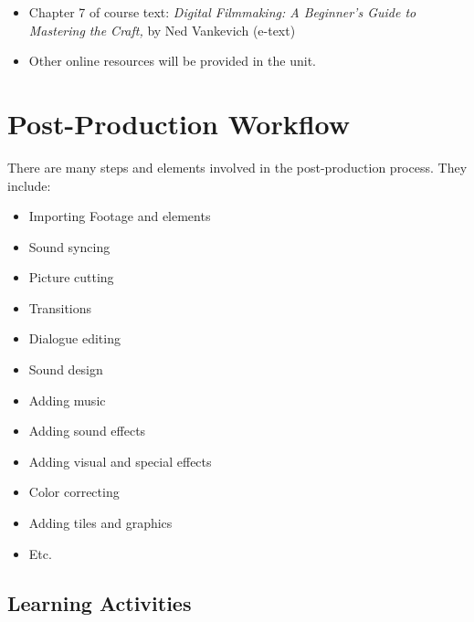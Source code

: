 \documentclass[
]{book}
\providecommand{\tightlist}{%
  \setlength{\itemsep}{0pt}\setlength{\parskip}{0pt}}
\begin{document}
\begin{itemize}
\tightlist
\item
  Chapter 7 of course text: \emph{Digital Filmmaking: A Beginner's Guide to Mastering the Craft,} by Ned Vankevich (e-text)
\item
  Other online resources will be provided in the unit.
\end{itemize}

\hypertarget{post-production-workflow}{%
\section{Post-Production Workflow}\label{post-production-workflow}}

There are many steps and elements involved in the post-production process. They include:

\begin{itemize}
\tightlist
\item
  Importing Footage and elements\\
\item
  Sound syncing\\
\item
  Picture cutting\\
\item
  Transitions\\
\item
  Dialogue editing\\
\item
  Sound design\\
\item
  Adding music\\
\item
  Adding sound effects\\
\item
  Adding visual and special effects\\
\item
  Color correcting\\
\item
  Adding tiles and graphics\\
\item
  Etc.
\end{itemize}

\hypertarget{learning-activities}{%
\subsection*{Learning Activities}\label{learning-activities}}
\end{document}
